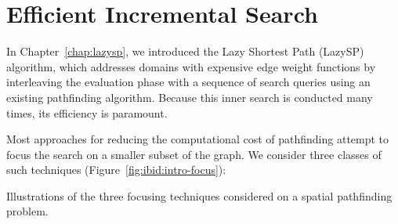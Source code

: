 \chapter{Efficient Incremental Search}
\label{chap:ibid}

In Chapter~\ref{chap:lazysp},
we introduced the Lazy Shortest Path (LazySP) algorithm,
which addresses domains with expensive edge weight functions
by interleaving the evaluation phase with a sequence of 
search queries using an existing pathfinding algorithm.
Because this inner search is conducted many times,
its efficiency is paramount.

Most approaches for reducing the computational cost of pathfinding
attempt to focus the search on a smaller subset of the graph.
We consider three classes of such techniques
(Figure~\ref{fig:ibid:intro-focus}):

\begin{marginfigure}[5cm]%
   \centering%
   
   

   \vspace{0.2cm}
   
   \caption{Illustrations of the three focusing techniques considered
      on a spatial pathfinding problem.}%
   \label{fig:ibid:intro-focus}
\end{marginfigure}

